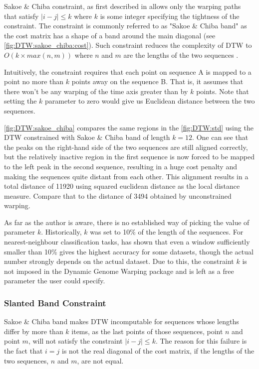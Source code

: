 \documentclass[parskip]{cs4rep}
\begin{document}
Sakoe \& Chiba constraint, as first described in \citep{Sakoe:1978ta} allows only the warping paths 
that satisfy $|i-j| \le k$ where $k$ is some integer specifying the tightness of the constraint. The constraint is commonly referred to as "Sakoe \& Chiba band" as the cost matrix has a shape of a band around the main diagonal (see \autoref{fig:DTW:sakoe_chiba:cost}). Such constraint reduces the complexity of DTW to $O(k \times max(n,m))$ where $n$ and $m$ are the lengths of the two sequences \cite{Muller:2007bo}. 

Intuitively, the constraint requires that each point on sequence A is mapped to a point no more than $k$ points away on the sequence B. That is, it assumes that there won't be any warping of the time axis greater than by $k$ points. Note that setting the $k$ parameter to zero would give us Euclidean distance between the two sequences.

\autoref{fig:DTW:sakoe_chiba} compares the same regions in the \autoref{fig:DTW:std} using the DTW constrained with Sakoe \& Chiba band of length $k=12$. One can see that the peaks on the right-hand side of the two sequences are still aligned correctly, but the relatively inactive region in the first sequence is now forced to be mapped to the left peak in the second sequence, resulting in a huge cost penalty and making the sequences quite distant from each other. This alignment results in a total distance of 11920 using squared euclidean distance as the local distance measure. Compare that to the distance of 3494 obtained by unconstrained warping.

As far as the author is aware, there is no established way of picking the value of parameter $k$.
Historically, $k$ was set to 10\% of the length of the sequences.
For nearest-neighbour classification tasks, \cite{Ratanamahatana:2004wu} has shown that even a window sufficiently smaller than 10\% gives the highest accuracy for some datasets, though the actual number strongly depends on the actual dataset. Due to this, the constraint $k$ is not imposed in the Dynamic Genome Warping package and is left as a free parameter the user could specify.

\subsubsection{Slanted Band Constraint}
\label{sec:slanted-band-constraint}

Sakoe \& Chiba band makes DTW incomputable for sequences whose lengths differ by more than $k$ items, as the last points of those sequences, point $n$ and point $m$, will not satisfy the constraint 
$|i-j| \le k$. The reason for this failure is the fact that $i=j$ is not the real diagonal of the cost matrix, if the lengths of the two sequences, $n$ and $m$, are not equal. 
\end{document}
